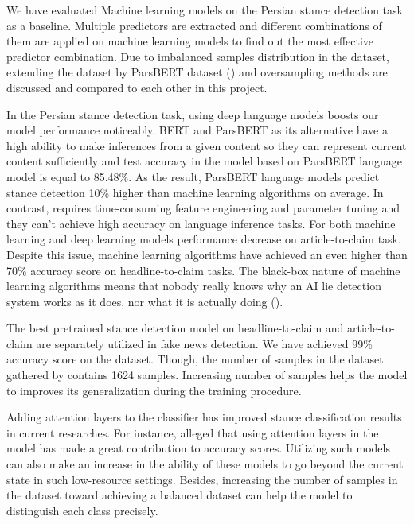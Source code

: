 We have evaluated Machine learning models on the Persian stance detection task as a baseline. Multiple predictors are extracted and different combinations of them are applied on machine learning models to find out the most effective predictor combination. Due to imbalanced samples distribution in the \cite{stance_persian} dataset, extending the dataset by ParsBERT dataset (\cite{parsbert}) and oversampling methods are discussed and compared to each other in this project.

In the Persian stance detection task, using deep language models boosts our model performance noticeably. BERT and ParsBERT as its alternative have a high ability to make inferences from a given content so they can represent current content sufficiently and test accuracy in the model based on ParsBERT language model is equal to 85.48\%. As the result,  ParsBERT language models predict stance detection 10\% higher than machine learning algorithms on average. In contrast, requires time-consuming feature engineering and parameter tuning and they can't achieve high accuracy on language inference tasks. For both machine learning and deep learning models performance decrease on article-to-claim task. Despite this issue, machine learning algorithms have achieved an even higher than 70\% accuracy score on headline-to-claim tasks. The black-box nature of machine learning algorithms means that nobody really knows why an AI lie detection system works as it does, nor what it is actually doing (\cite{book_fake}). 

The best pretrained stance detection model on headline-to-claim and article-to-claim are separately utilized in fake news detection. We have achieved 99\% accuracy score on the \cite{stance_persian} dataset. Though, the number of samples in the dataset gathered by \cite{stance_persian} contains 1624 samples. Increasing number of samples helps the model to improves its generalization during the training procedure.

Adding attention layers to the classifier has improved stance classification results in current researches. For instance, \cite{book_disinformation} alleged that using attention layers in the model has made a great contribution to accuracy scores. Utilizing such models can also make an increase in the ability of these models to go beyond the current state in such low-resource settings. Besides, increasing the number of samples in the \cite{stance_persian} dataset toward achieving a balanced dataset can help the model to distinguish each class precisely. 
 
 
 